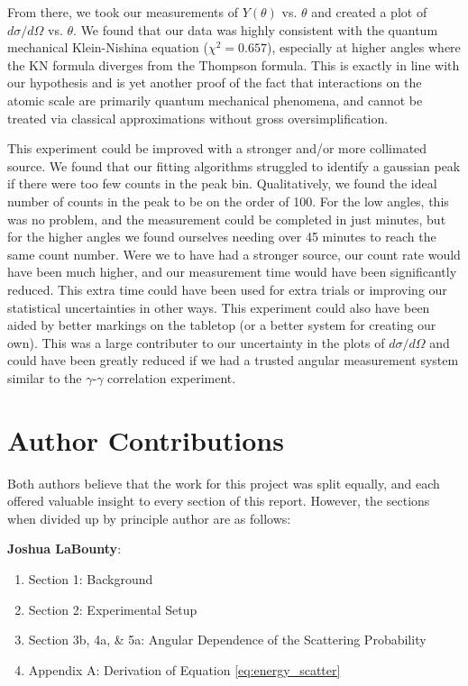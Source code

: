 \documentclass[%
 reprint,
 amsmath,amssymb,
 aps,
 pra,
]{revtex4-1}
\begin{document}
From there, we took our measurements of $Y(\theta)$ vs. $\theta$ and created a plot of $d\sigma / d\Omega$ vs. $\theta$. We found that our data was highly consistent with the quantum mechanical Klein-Nishina equation ($\chi^2 = 0.657$), especially at higher angles where the KN formula diverges from the Thompson formula. This is exactly in line with our hypothesis and is yet another proof of the fact that interactions on the atomic scale are primarily quantum mechanical phenomena, and cannot be treated via classical approximations without gross oversimplification.

This experiment could be improved with a stronger and/or more collimated source. We found that our fitting algorithms struggled to identify a gaussian peak if there were too few counts in the peak bin. Qualitatively, we found the ideal number of counts in the peak to be on the order of 100. For the low angles, this was no problem, and the measurement could be completed in just minutes, but for the higher angles we found ourselves needing over 45 minutes to reach the same count number. Were we to have had a stronger source, our count rate would have been much higher, and our measurement time would have been significantly reduced. This extra time could have been used for extra trials or improving our statistical uncertainties in other ways. This experiment could also have been aided by better markings on the tabletop (or a better system for creating our own). This was a large contributer to our uncertainty in the plots of $d\sigma / d\Omega$ and could have been greatly reduced if we had a trusted angular measurement system similar to the $\gamma$-$\gamma$ correlation experiment.

\section{Author Contributions}

Both authors believe that the work for this project was split equally, and each offered valuable insight to every section of this report. However, the sections when divided up by principle author are as follows:

\noindent \textbf{Joshua LaBounty}:
\begin{enumerate}
	\item Section 1: Background 
	\item Section 2: Experimental Setup
	\item Section 3b, 4a, \& 5a: Angular Dependence of the Scattering Probability
	\item Appendix A: Derivation of Equation \ref{eq:energy_scatter}
\end{enumerate}
\end{document}

